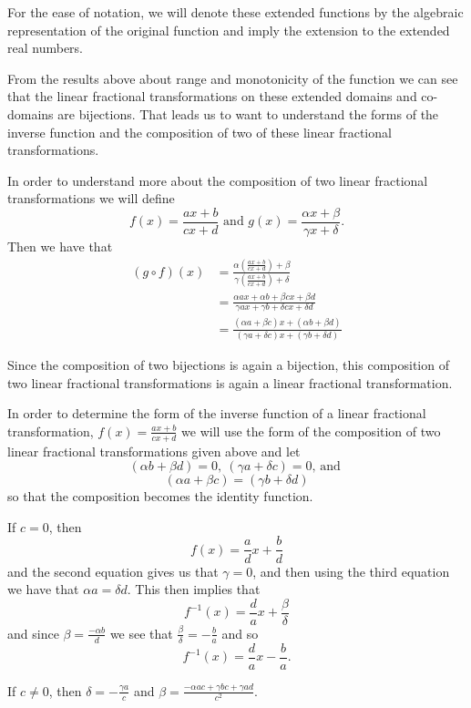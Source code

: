 \documentclass[
]{book}
\theoremstyle{definition}
\theoremstyle{definition}
\theoremstyle{definition}
\theoremstyle{definition}
\theoremstyle{remark}
\begin{document}
For the ease of notation, we will denote these extended functions by the algebraic representation of the original function and imply the extension to the extended real numbers.

From the results above about range and monotonicity of the function we can see that the linear fractional transformations on these extended domains and co-domains are bijections. That leads us to want to understand the forms of the inverse function and the composition of two of these linear fractional transformations.

In order to understand more about the composition of two linear fractional transformations we will define
\[f(x)=\frac{ax+b}{cx+d} \mbox{ and } g(x)=\frac{\alpha x + \beta}{\gamma x + \delta}.\]
Then we have that
\begin{align*}
    (g\circ f) (x) & = \frac{\alpha \left(\frac{ax+b}{cx+d}\right) + \beta}{\gamma \left( \frac{ax+b}{cx+d}\right) + \delta } \\
    & = \frac{ \alpha a x + \alpha b + \beta cx+ \beta d}{\gamma a x + \gamma b + \delta cx + \delta d} \\
    & = \frac{ \left(\alpha a + \beta c\right) x + \left(\alpha b + \beta d\right)}{\left(\gamma a + \delta c\right)x+\left(\gamma b + \delta d\right)} 
\end{align*}

Since the composition of two bijections is again a bijection, this composition of two linear fractional transformations is again a linear fractional transformation.

In order to determine the form of the inverse function of a linear fractional transformation, \(f(x)=\frac{ax+b}{cx+d}\) we will use the form of the composition of two linear fractional transformations given above and let \[(\alpha b+\beta d)=0, \: (\gamma a + \delta c)=0\mbox{, and }\] \[(\alpha a + \beta c) = (\gamma b+\delta d)\] so that the composition becomes the identity function.

If \(c=0\), then \[f(x)= \frac{a}{d} x + \frac{b}{d}\] and the second equation gives us that \(\gamma =0\), and then using the third equation we have that \(\alpha a = \delta d\). This then implies that \[f^{-1}(x)= \frac{d}{a} x +  \frac{\beta}{\delta}\] and since \(\beta = \frac{-\alpha b}{d}\) we see that \(\frac{\beta}{\delta} = -\frac{b}{a}\) and so \[f^{-1}(x)= \frac{d}{a} x - \frac{b}{a}.\]

If \(c\neq 0\), then \(\delta = -\frac{\gamma a}{c}\) and \(\beta = \frac{-\alpha ac + \gamma bc + \gamma a d}{c^2}\).
\end{document}
